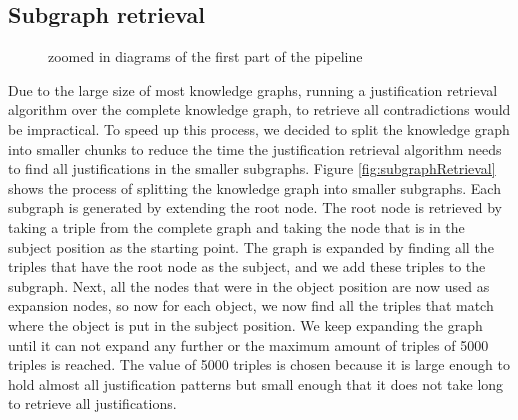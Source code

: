 \documentclass{article}
\begin{document}
\subsection{Subgraph retrieval}
\begin{figure}[!t]
	\hfill
	\caption{zoomed in diagrams of the first part of the pipeline}
	\label{fig:PipelinePart12}
\end{figure}
Due to the large size of most knowledge graphs, running a justification retrieval algorithm over the complete knowledge graph, to retrieve all contradictions would be impractical. To speed up this process, we decided to split the knowledge graph into smaller chunks to reduce the time the justification retrieval algorithm needs to find all justifications in the smaller subgraphs. Figure \ref{fig:subgraphRetrieval} shows the process of splitting the knowledge graph into smaller subgraphs.
Each subgraph is generated by extending the root node. The root node is retrieved by taking a triple from the complete graph and taking the node that is in the subject position as the starting point. The graph is expanded by finding all the triples that have the root node as the subject, and we add these triples to the subgraph. Next, all the nodes that were in the object position are now used as expansion nodes, so now for each object, we now find all the triples that match where the object is put in the subject position. We keep expanding the graph until it can not expand any further or the maximum amount of triples of 5000 triples is reached. The value of 5000 triples is chosen because it is large enough to hold almost all justification patterns but small enough that it does not take long to retrieve all justifications.\\
\end{document}
